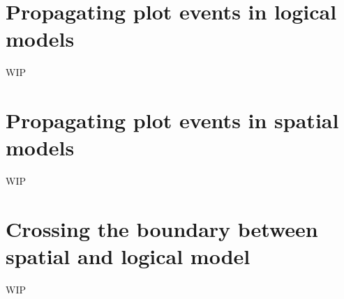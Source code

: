 
\section{Propagating plot events in logical models}

WIP

\section{Propagating plot events in spatial models}

WIP

\section{Crossing the boundary between spatial and logical model}

WIP